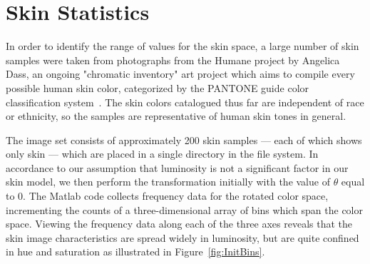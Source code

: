 %
%

\chapter{Skin Statistics}\label{sec:ChapSkin}
\ifpdf
    \graphicspath{{Chapter3/Figs/Raster/}{Chapter3/Figs/PDF/}{Chapter3/Figs/}}
\else
    \graphicspath{{Chapter3/Figs/Vector/}{Chapter3/Figs/}}
\fi

In order to identify the range of values for the skin space, a large number of skin samples were taken from photographs from the Humane project by Angelica Dass, an ongoing "chromatic inventory" art project which aims to compile every possible human skin color, categorized by the PANTONE guide color classification system~\cite{Dass2012}. The skin colors catalogued thus far are independent of race or ethnicity, so the samples are representative of human skin tones in general.

The image set consists of approximately 200 skin samples --- each of which shows only skin --- which are placed in a single directory in the file system. In accordance to our assumption that luminosity is not a significant factor in our skin model, we then perform the transformation initially with the value of $\theta$ equal to 0. The Matlab code collects frequency data for the rotated color space, incrementing the counts of a three-dimensional array of bins which span the color space. Viewing the frequency data along each of the three axes reveals that the skin image characteristics are spread widely in luminosity, but are quite confined in hue and saturation as illustrated in Figure~\ref{fig:InitBins}.


